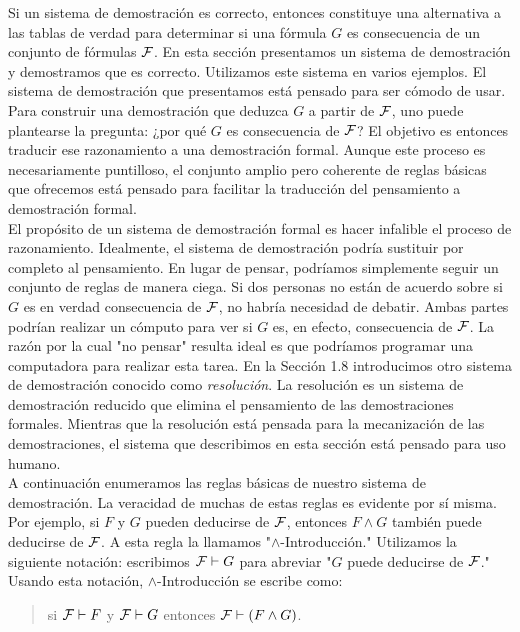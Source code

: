\message{ !name(main.tex)}\documentclass[12pt,a4paper]{book}
\newcommand{\comillas}[1]{"#1"}
\begin{document}
    Si un sistema de demostración es correcto, entonces constituye una alternativa a las tablas de verdad para determinar si una
    fórmula $G$ es consecuencia de un conjunto de fórmulas $\mathcal{F}$. En esta sección presentamos un sistema de demostración y
    demostramos que es correcto. Utilizamos este sistema en varios ejemplos. El sistema de demostración que presentamos está
    pensado para ser cómodo de usar. Para construir una demostración que deduzca $G$ a partir de $\mathcal{F}$, uno puede plantearse la
    pregunta: ¿por qué $G$ es consecuencia de $\mathcal{F}$? El objetivo es entonces traducir ese razonamiento a una demostración formal.
    Aunque este proceso es necesariamente puntilloso, el conjunto amplio pero coherente de reglas básicas que ofrecemos está
    pensado para facilitar la traducción del pensamiento a demostración formal.\\
    El propósito de un sistema de demostración formal es hacer infalible el proceso de razonamiento. Idealmente, el sistema de
    demostración podría sustituir por completo al pensamiento. En lugar de pensar, podríamos simplemente seguir un conjunto de
    reglas de manera ciega. Si dos personas no están de acuerdo sobre si $G$ es en verdad consecuencia de $\mathcal{F}$, no habría
    necesidad de debatir. Ambas partes podrían realizar un cómputo para ver si $G$ es, en efecto, consecuencia de $\mathcal{F}$. La razón
    por la cual \comillas{no pensar} resulta ideal es que podríamos programar una computadora para realizar esta tarea. En la
    Sección 1.8 introducimos otro sistema de demostración conocido como \textit{resolución}. La resolución es un sistema de
    demostración reducido que elimina el pensamiento de las demostraciones formales. Mientras que la resolución está pensada
    para la mecanización de las demostraciones, el sistema que describimos en esta sección está pensado para uso humano.\\
    A continuación enumeramos las reglas básicas de nuestro sistema de demostración. La veracidad de muchas de estas reglas es
    evidente por sí misma. Por ejemplo, si $F$ y $G$ pueden deducirse de $\mathcal{F}$, entonces $F\wedge G$ también puede deducirse de
    $\mathcal{F}$. A esta regla la llamamos \comillas{$\wedge$-Introducción.} Utilizamos la siguiente notación: escribimos $\mathcal{F}\vdash G$
    para abreviar \comillas{$G$ puede deducirse de $\mathcal{F}$.} Usando esta notación, $\wedge$-Introducción se escribe como:

    \begin{quote}
        si $\mathcal{F}\vdash F$ y $\mathcal{F}\vdash G$ entonces $\mathcal{F}\vdash(F\wedge G)$.
    \end{quote}
\end{document}

